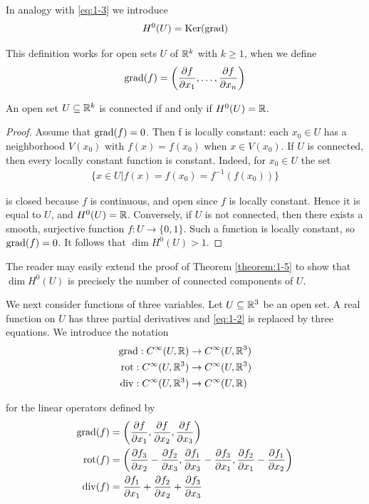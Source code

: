 In analogy with \eqref{eq:1-3} we introduce
\begin{align}\label{eq:1-5}
  H^0(U) = \operatorname{Ker}(\operatorname{grad})
\end{align}

This definition works for open sets $U$ of ${\mathbb{R}}^k$ with $k\ge1$, when we define
\begin{align*}
  \operatorname{grad}(f) = \left(\frac{\partial f}{\partial x_1}, \ldots, \frac{\partial f}{\partial x_n}\right)
\end{align*}

\begin{theorem}\label{theorem:1-5}
  An open set $U\subseteq{\ensuremath{\mathbb{R}}}^k$ is connected if and only if $H^0(U) = {\mathbb{R}}$.
\end{theorem}

\begin{proof}
  Assume that $\operatorname{grad}(f) = 0$. Then f is locally constant: each $x_0\in U$ has
a neighborhood $V(x_0)$ with $f(x) = f(x_0)$ when $x\in V(x_0)$. If $U$ is connected,
then every locally constant function is constant. Indeed, for $x_0\in U$ the set
\begin{align*}
  \{x\in U|f(x) = f(x_0) = f^{-1}(f(x_0))\}
\end{align*}

is closed because $f$ is continuous, and open since $f$ is locally constant. Hence
it is equal to $U$, and $H^0(U) = {\mathbb{R}}$. Conversely, if $U$ is not connected, then there
exists a smooth, surjective function $f:U\to \{0, 1\}$. Such a function is locally
constant, so $\operatorname{grad}(f) = 0$. It follows that $\dim H^0(U) > 1$.
\end{proof}

The reader may easily extend the proof of Theorem \ref{theorem:1-5} to show that $\dim H^0(U)$
is precisely the number of connected components of $U$.


We next consider functions of three variables. Let $U\subseteq{\ensuremath{\mathbb{R}}}^3$ be an open set. A real
function on $U$ has three partial derivatives and \eqref{eq:1-2} is replaced by three equations.
We introduce the notation
\begin{align*}
  \operatorname{grad}: C^\infty(U, {\mathbb{R}}) & \to C^\infty(U, {\mathbb{R}}^3) \\
  \operatorname{rot}: C^\infty(U, {\mathbb{R}}^3) & \to C^\infty(U, {\mathbb{R}}^3) \\
  \operatorname{div}: C^\infty(U, {\mathbb{R}}^3) & \to C^\infty(U, {\mathbb{R}})
\end{align*}

for the linear operators defined by
\begin{align*}
  \operatorname{grad}(f) & = \left(\frac{\partial f}{\partial x_1}, \frac{\partial f}{\partial x_2}, \frac{\partial f}{\partial x_3}\right) \\
  \operatorname{rot}(f) & = \left(\frac{\partial f_3}{\partial x_2} - \frac{\partial f_2}{\partial x_3}, \frac{\partial f_1}{\partial x_3} - \frac{\partial f_3}{\partial x_1}, \frac{\partial f_2}{\partial x_1} - \frac{\partial f_1}{\partial x_2}\right) \\
  \operatorname{div}(f) & = \frac{\partial f_1}{\partial x_1} + \frac{\partial f_2}{\partial x_2} + \frac{\partial f_3}{\partial x_3}
\end{align*}

